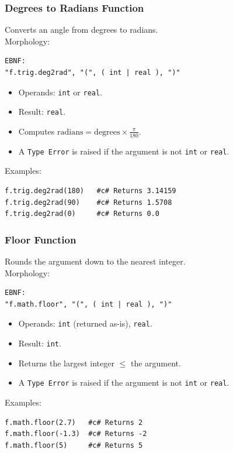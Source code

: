 \subsubsection{Degrees to Radians Function}
Converts an angle from degrees to radians. \\
Morphology:
\begin{verbatim}
EBNF:
"f.trig.deg2rad", "(", ( int | real ), ")"
\end{verbatim}
\begin{itemize}
\item Operands: \texttt{int} or \texttt{real}.
\item Result: \texttt{real}.
\item Computes $\text{radians} = \text{degrees} \times \frac{\pi}{180}$.
\item A \texttt{Type Error} is raised if the argument is not \texttt{int} or \texttt{real}.
\end{itemize}
Examples:
\begin{verbatim}
f.trig.deg2rad(180)   #c# Returns 3.14159
f.trig.deg2rad(90)    #c# Returns 1.5708
f.trig.deg2rad(0)     #c# Returns 0.0
\end{verbatim}

\subsubsection{Floor Function}
Rounds the argument down to the nearest integer. \\
Morphology:
\begin{verbatim}
EBNF:
"f.math.floor", "(", ( int | real ), ")"
\end{verbatim}
\begin{itemize}
\item Operands: \texttt{int} (returned as-is), \texttt{real}.
\item Result: \texttt{int}.
\item Returns the largest integer $\leq$ the argument.
\item A \texttt{Type Error} is raised if the argument is not \texttt{int} or \texttt{real}.
\end{itemize}
Examples:
\begin{verbatim}
f.math.floor(2.7)   #c# Returns 2
f.math.floor(-1.3)  #c# Returns -2
f.math.floor(5)     #c# Returns 5
\end{verbatim}

